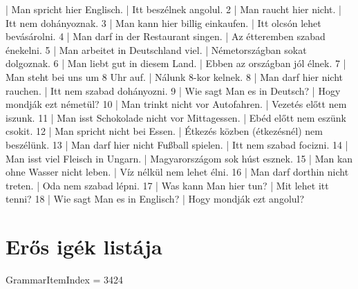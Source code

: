 \documentclass{article}
\newenvironment{exmp}{\verbatim}{\endverbatim}
\begin{document}
\begin{exmp}
1 | Man spricht hier Englisch. | Itt beszélnek angolul.
2 | Man raucht hier nicht. | Itt nem dohányoznak.
3 | Man kann hier billig einkaufen. | Itt olcsón lehet bevásárolni.
4 | Man darf in der Restaurant singen. | Az étteremben szabad énekelni.
5 | Man arbeitet in Deutschland viel. | Németországban sokat dolgoznak.
6 | Man liebt gut in diesem Land. | Ebben az országban jól élnek.
7 | Man steht bei uns um 8 Uhr auf. | Nálunk 8-kor kelnek.
8 | Man darf hier nicht rauchen. | Itt nem szabad dohányozni.
9 | Wie sagt Man es in Deutsch? | Hogy mondják ezt németül?
10 | Man trinkt nicht vor Autofahren. | Vezetés előtt nem iszunk.
11 | Man isst Schokolade nicht vor Mittagessen. | Ebéd előtt nem eszünk csokit.
12 | Man spricht nicht bei Essen. | Étkezés közben (étkezésnél) nem beszélünk.
13 | Man darf hier nicht Fußball spielen. | Itt nem szabad focizni.
14 | Man isst viel Fleisch in Ungarn. | Magyarországom sok húst esznek.
15 | Man kan ohne Wasser nicht leben. | Víz nélkül nem lehet élni.
16 | Man darf dorthin nicht treten. | Oda nem szabad lépni.
17 | Was kann Man hier tun? | Mit lehet itt tenni?
18 | Wie sagt Man es in Englisch? | Hogy mondják ezt angolul?
\end{exmp}

\section{Erős igék listája}

GrammarItemIndex = 3424
\end{document}
